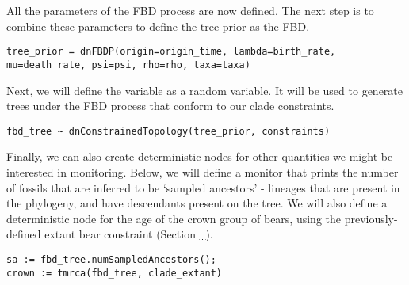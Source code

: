 All the parameters of the FBD process are now defined. The next step is to combine these parameters to define the tree prior as the FBD.

{\tt \begin{snugshade*}
\begin{lstlisting}
tree_prior = dnFBDP(origin=origin_time, lambda=birth_rate, mu=death_rate, psi=psi, rho=rho, taxa=taxa)
\end{lstlisting}
\end{snugshade*}}

Next, we will define the  variable as a random variable. It will be used to generate trees under the FBD process that conform to our clade constraints. 

{\tt \begin{snugshade*}
\begin{lstlisting}
fbd_tree ~ dnConstrainedTopology(tree_prior, constraints) 
\end{lstlisting}
\end{snugshade*}}

Finally, we can also create deterministic nodes for other quantities we might be interested in monitoring. Below, we will define a monitor that prints the number of fossils that are inferred to be `sampled ancestors' - lineages that are present in the phylogeny, and have descendants present on the tree. We will also define a deterministic node for the age of the crown group of bears, using the previously-defined extant bear constraint (Section \ref{}).

{\tt \begin{snugshade*}
\begin{lstlisting}
sa := fbd_tree.numSampledAncestors();
crown := tmrca(fbd_tree, clade_extant)
\end{lstlisting}
\end{snugshade*}}






%
%
